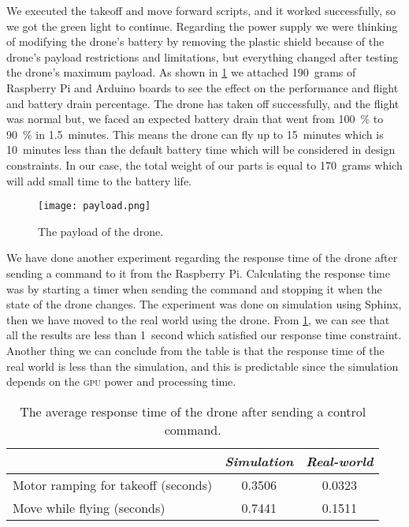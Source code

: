 \documentclass[../main.tex]{subfiles}
\begin{document}
We executed the takeoff and move forward scripts,
and it worked successfully, so we got the green 
light to continue. 
Regarding the power supply we were thinking 
of modifying the drone's battery by removing the 
plastic shield because of the drone's payload restrictions 
and limitations, but everything changed after testing 
the drone's maximum payload. As shown in \cref{fig:payload}
we attached \SI{190}{grams} of Raspberry Pi and Arduino boards
to see the effect on the performance and flight and
battery drain percentage. 
The drone has taken off  successfully, 
and the flight was normal but, we faced an expected 
battery drain that went from 
\SI{100}{\percent} to \SI{90}{\percent} in 
\SI{1.5}{minutes}.
This means the drone can fly up to 
\SI{15}{minutes} which is \SI{10}{minutes} 
less than the default battery time 
which will be considered in design constraints.
In our case, the total weight of our parts is equal
to \SI{170}{grams} which will add small time
to the battery life.

\begin{figure}[bp]
	\centering
	\texttt{[image: payload.png]}
	\caption{The payload of the drone.}
	\label{fig:payload}
\end{figure} 


We have done another experiment regarding the response time 
of the drone after sending a command to it from the Raspberry Pi. 
Calculating the response time was by starting a timer when 
sending the command and stopping it when the 
state of the drone changes. 
The experiment was done on simulation using Sphinx,
then we have moved to the real world using the \anafi drone.
From \cref{tab:respone-time}, 
we can see that all the results are less than \SI{1}{second}
which satisfied our response time constraint.
Another thing we can conclude from the table is that 
the response time of the real world is less than 
the simulation, and this is predictable since the simulation
depends on the \textsc{gpu} power and processing time. 

\begin{table}[tbp]
	\centering
	\caption{The average response time of the drone after sending a control command.}
	\label{tab:respone-time}
        \begin{tabularx}{0.7\textwidth}{ X c c }
		\toprule
		\textit{} & \textit{Simulation} & \textit{Real-world}\\ \midrule
		Motor ramping for takeoff (seconds)  & 0.3506 & 0.0323     \\
		Move while flying (seconds) & 0.7441  & 0.1511   \\
		\bottomrule
	\end{tabularx}
\end{table} 
\end{document}
